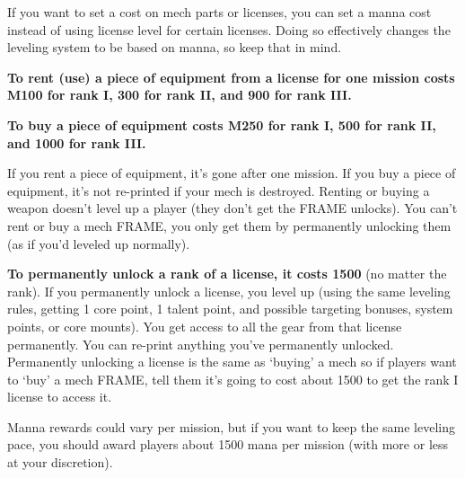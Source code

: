 If you want to set a cost on mech parts or licenses, you can set a manna cost instead of using
license level for certain licenses. Doing so effectively changes the leveling system to be based on
manna, so keep that in mind.

\textbf{To rent (use) a piece of equipment from a license for one mission costs M100 for rank I, 300
for rank II, and 900 for rank III.}

\textbf{To buy a piece of equipment costs M250 for rank I, 500 for rank II, and 1000 for rank III.}

If you rent a piece of equipment, it’s gone after one mission. If you buy a piece of equipment, it’s
not re-printed if your mech is destroyed. Renting or buying a weapon doesn’t level up a player
(they don’t get the FRAME unlocks). You can’t rent or buy a mech FRAME, you only get them by
permanently unlocking them (as if you’d leveled up normally).

\textbf{To permanently unlock a rank of a license, it costs 1500} (no matter the rank). If you
permanently unlock a license, you level up (using the same leveling rules, getting 1 core point, 1
talent point, and possible targeting bonuses, system points, or core mounts). You get access to
all the gear from that license permanently. You can re-print anything you’ve permanently
unlocked. Permanently unlocking a license is the same as ‘buying’ a mech so if players want to
‘buy’ a mech FRAME, tell them it’s going to cost about 1500 to get the rank I license to access it.

Manna rewards could vary per mission, but if you want to keep the same leveling pace, you
should award players about 1500 mana per mission (with more or less at your discretion).